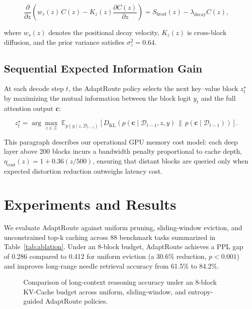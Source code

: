 \documentclass[11pt]{article}
\begin{document}
\begin{equation}
\label{eq:transport}
\frac{\partial}{\partial z}\!\left(w_s(z)\, C(z) - K_z(z)\frac{\partial C(z)}{\partial z}\right) = S_{\text{head}}(z) - \lambda_{\text{decay}} C(z),
\end{equation}

where $w_s(z)$ denotes the positional decay velocity, $K_z(z)$ is cross-block diffusion, and the prior variance satisfies $\sigma_z^2 = 0.64$.

\subsection{Sequential Expected Information Gain}
At each decode step $t$, the AdaptRoute policy selects the next key--value block $z_t^\star$ by maximizing the mutual information between the block logit $y_t$ and the full attention output $\mathbf{c}$:

\begin{equation}
\label{eq:eig}
z_t^\star = \arg\max_{z \in \mathcal{Z}} \; \mathbb{E}_{p(y \mid z, \mathcal{D}_{t-1})}\!\left[ D_{\text{KL}}\!\left(p(\mathbf{c} \mid \mathcal{D}_{t-1}, z, y) \,\|\, p(\mathbf{c} \mid \mathcal{D}_{t-1})\right) \right].
\end{equation}

This paragraph describes our operational GPU memory cost model: each deep layer above 200 blocks incurs a bandwidth penalty proportional to cache depth, $\eta_{\text{cost}}(z) = 1 + 0.36 (z / 500)$, ensuring that distant blocks are queried only when expected distortion reduction outweighs latency cost.

\section{Experiments and Results}
\label{sec:results}

We evaluate AdaptRoute against uniform pruning, sliding-window eviction, and unconstrained top-k caching across 88 benchmark tasks summarized in Table~\ref{tab:ablation}. Under an 8-block budget, AdaptRoute achieves a PPL gap of 0.286 compared to 0.412 for uniform eviction (a 30.6\% reduction, $p < 0.001$) and improves long-range needle retrieval accuracy from 61.5\% to 84.2\%.

\begin{figure}[t]
\caption{Comparison of long-context reasoning accuracy under an 8-block KV-Cache budget across uniform, sliding-window, and entropy-guided AdaptRoute policies.}
\label{fig:profile_overview}
\end{figure}
\end{document}
